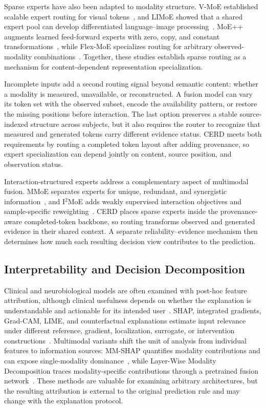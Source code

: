 \documentclass[a4paper,fleqn]{cas-dc}
\begin{document}
Sparse experts have also been adapted to modality structure. V-MoE established scalable expert routing for visual tokens~\cite{riquelme2021vmoe}, and LIMoE showed that a shared expert pool can develop differentiated language--image processing~\cite{mustafa2022limoe}. MoE++ augments learned feed-forward experts with zero, copy, and constant transformations~\cite{jin2025moepp}, while Flex-MoE specializes routing for arbitrary observed-modality combinations~\cite{ref_flexmoe}. Together, these studies establish sparse routing as a mechanism for content-dependent representation specialization.

Incomplete inputs add a second routing signal beyond semantic content: whether a modality is measured, unavailable, or reconstructed. A fusion model can vary its token set with the observed subset, encode the availability pattern, or restore the missing positions before interaction. The last option preserves a stable source-indexed structure across subjects, but it also requires the router to recognize that measured and generated tokens carry different evidence status. CERD meets both requirements by routing a completed token layout after adding provenance, so expert specialization can depend jointly on content, source position, and observation status.

Interaction-structured experts address a complementary aspect of multimodal fusion. MMoE separates experts for unique, redundant, and synergistic information~\cite{yu2024mmoe}, and I$^2$MoE adds weakly supervised interaction objectives and sample-specific reweighting~\cite{xin2025i2moe}. CERD places sparse experts inside the provenance-aware completed-token backbone, so routing transforms observed and generated evidence in their shared context. A separate reliability--evidence mechanism then determines how much each resulting decision view contributes to the prediction.

\subsection{Interpretability and Decision Decomposition}

Clinical and neurobiological models are often examined with post-hoc feature attribution, although clinical usefulness depends on whether the explanation is understandable and actionable for its intended user~\cite{ref_tonekaboni2019clinicians,ref_sadeghi2024xai,ref_borys2023}. SHAP, integrated gradients, Grad-CAM, LIME, and counterfactual explanations estimate input relevance under different reference, gradient, localization, surrogate, or intervention constructions~\cite{ref_lundberg2017shap,ref_sundararajan2017ig,ref_selvaraju2017gradcam,ref_ribeiro2016lime,ref_wachter2017counterfactual}. Multimodal variants shift the unit of analysis from individual features to information sources: MM-SHAP quantifies modality contributions and can expose single-modality dominance~\cite{parcalabescu2023mmshap}, while Layer-Wise Modality Decomposition traces modality-specific contributions through a pretrained fusion network~\cite{park2025lmd}. These methods are valuable for examining arbitrary architectures, but the resulting attribution is external to the original prediction rule and may change with the explanation protocol.
\end{document}
